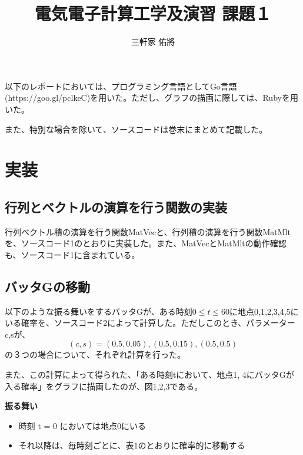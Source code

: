 \documentclass[11pt]{ltjsarticle}
\title{電気電子計算工学及演習 課題１}
\author{三軒家 佑將}
\date{}
\begin{document}
\maketitle

以下のレポートにおいては、プログラミング言語としてGo言語(https://goo.gl/pclkeC)を用いた。ただし、グラフの描画に際しては、Rubyを用いた。

また、特別な場合を除いて、ソースコードは巻末にまとめて記載した。

\section{実装}
\subsection{行列とベクトルの演算を行う関数の実装}
	行列ベクトル積の演算を行う関数MatVecと、行列積の演算を行う関数MatMltを、ソースコード1のとおりに実装した。また、MatVecとMatMltの動作確認も、ソースコード1に含まれている。

\subsection{バッタGの移動}
以下のような振る舞いをするバッタGが、ある時刻$0 \leq t \leq 60$に地点0,1,2,3,4,5にいる確率を、ソースコード2によって計算した。ただしこのとき、パラメーターc,sが、
\[
	(c,s) = (0.5, 0.05), (0.5, 0.15), (0.5, 0.5)
\]
の３つの場合について、それぞれ計算を行った。

また、この計算によって得られた、「ある時刻tにおいて、地点1, 4にバッタGが入る確率」をグラフに描画したのが、図1,2,3である。


{\bf 振る舞い}
\begin{itemize}
	\item 時刻 t = 0 においては地点0にいる
	\item それ以降は、毎時刻ごとに、表1のとおりに確率的に移動する
\end{itemize}
\end{document}
